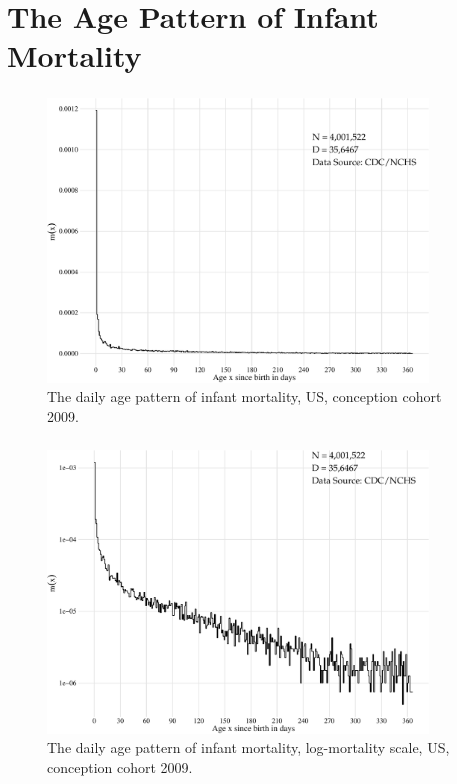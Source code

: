 \documentclass{beamer}
\begin{document}
\section{The Age Pattern of Infant Mortality} %

\begin{frame}
\frametitle{\insertsection}

\begin{figure}[htb!]
\includegraphics[width = 0.9\textwidth]{./fig/imort_mx.pdf} \\
The daily age pattern of infant mortality, US, conception cohort 2009.
\end{figure}

\end{frame}

\begin{frame}
\frametitle{\insertsection}

\begin{figure}[htb!]
\includegraphics[width = 0.9\textwidth]{./fig/imort_log_mx.pdf} \\
The daily age pattern of infant mortality, log-mortality scale, US, conception cohort 2009.
\end{figure}

\end{frame}
\end{document}

